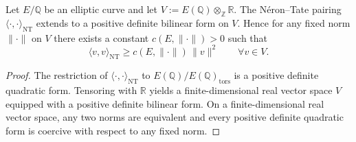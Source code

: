 \begin{lemma}
Let $E/\mathbb{Q}$ be an elliptic curve and let
$V:=E(\mathbb{Q})\otimes_{\mathbb{Z}}\mathbb{R}$.
The Néron--Tate pairing $\langle\cdot,\cdot\rangle_{\mathrm{NT}}$ extends to a
positive definite bilinear form on $V$.
Hence for any fixed norm $\|\cdot\|$ on $V$ there exists a constant $c(E,\|\cdot\|)>0$
such that
\[
\langle v,v\rangle_{\mathrm{NT}} \ge c(E,\|\cdot\|)\,\|v\|^2
\qquad \forall v\in V.
\]
\end{lemma}

\begin{proof}
The restriction of $\langle\cdot,\cdot\rangle_{\mathrm{NT}}$ to
$E(\mathbb{Q})/E(\mathbb{Q})_{\mathrm{tors}}$ is a positive definite quadratic form.
Tensoring with $\mathbb{R}$ yields a finite-dimensional real vector space $V$
equipped with a positive definite bilinear form.
On a finite-dimensional real vector space, any two norms are equivalent and every
positive definite quadratic form is coercive with respect to any fixed norm.
\end{proof}

